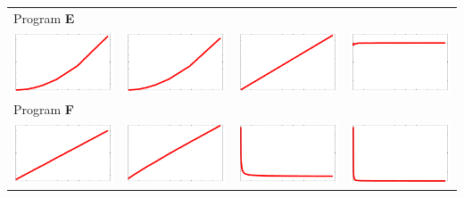 \documentclass[a4paper]{article}
\begin{document}
\begin{center}
\begin{tabular}{cccc}
    \midrule
    \multicolumn{4}{l}{Program \textbf{E}} \\
    \quad
    \includegraphics[width=0.23\columnwidth]{fn2.pdf} &
    \includegraphics[width=0.23\columnwidth]{fn2-log.pdf} &
    \includegraphics[width=0.23\columnwidth]{fn2-n.pdf} &
    \includegraphics[width=0.23\columnwidth]{fn2-n2.pdf} \\
    \midrule
    \multicolumn{4}{l}{Program \textbf{F}} \\
    \quad
    \includegraphics[width=0.23\columnwidth]{flin2.pdf} &
    \includegraphics[width=0.23\columnwidth]{flin2-log.pdf} &
    \includegraphics[width=0.23\columnwidth]{flin2-n.pdf} &
    \includegraphics[width=0.23\columnwidth]{flin2-n2.pdf} \\
    \bottomrule
  \end{tabular}
\end{center}
\end{document}
